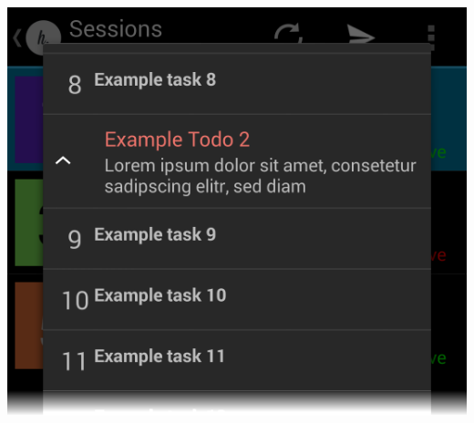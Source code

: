 \begin{minipage}[t]{0.45\linewidth}
	\centering
	\includegraphics[width=\linewidth]{img/screen_todos_tasks}
	 \label{fig:screen_todos_tasks}
\end{minipage}

\pagebreak

